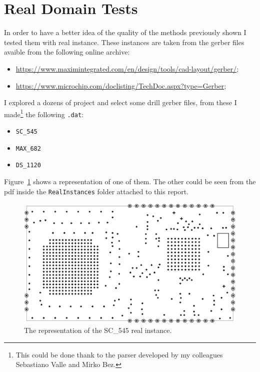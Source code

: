 \section{Real Domain Tests}
\label{sec:realDomainTests}
	In order to have a better idea of the quality of the methods previously shown I tested them with real instance. These instances are taken from the gerber files avaible from the following online archive:
	\begin{itemize}
		\item \href{https://www.maximintegrated.com/en/design/tools/cad-layout/gerber/}{https://www.maximintegrated.com/en/design/tools/cad-layout/gerber/};
		\item \href{https://www.microchip.com/doclisting/TechDoc.aspx?type=Gerber}{https://www.microchip.com/doclisting/TechDoc.aspx?type=Gerber};
	\end{itemize}

	I explored a dozens of project and select some drill gerber files, from these I made\footnote{This could be done thank to the parser developed by my colleagues Sebastiano Valle and Mirko Bez.} the following \verb|.dat|:
	
	\begin{itemize}
		\item \verb|SC_545|
		\item \verb|MAX_682|
		\item \verb|DS_1120|
	\end{itemize}
	Figure~\ref{fig:SC_545} shows a representation of one of them. The other could be seen from the pdf inside the \verb|RealInstances| folder attached to this report.

	\begin{figure} [h]
		\centering
		\includegraphics[width=\textwidth]{img/SC_545}
		\caption{The representation of the SC\_545 real instance.}
		\label{fig:SC_545}
	\end{figure}
	
